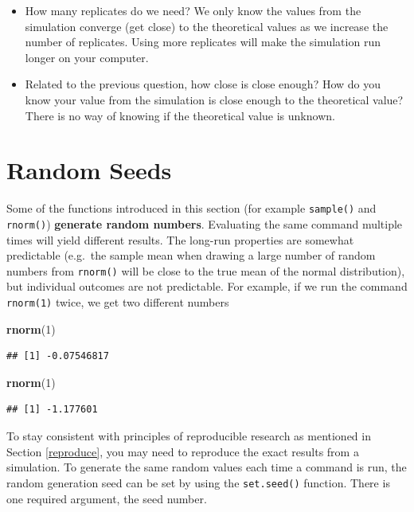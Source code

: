 \documentclass[
]{book}
\newenvironment{Shaded}{\begin{snugshade}}{\end{snugshade}}
\newcommand{\DecValTok}[1]{\textcolor[rgb]{0.00,0.00,0.81}{#1}}
\newcommand{\FunctionTok}[1]{\textcolor[rgb]{0.13,0.29,0.53}{\textbf{#1}}}
\newcommand{\NormalTok}[1]{#1}
\theoremstyle{definition}
\theoremstyle{definition}
\theoremstyle{definition}
\theoremstyle{definition}
\theoremstyle{remark}
\begin{document}
\begin{itemize}
\item
  How many replicates do we need? We only know the values from the simulation converge (get close) to the theoretical values as we increase the number of replicates. Using more replicates will make the simulation run longer on your computer.
\item
  Related to the previous question, how close is close enough? How do you know your value from the simulation is close enough to the theoretical value? There is no way of knowing if the theoretical value is unknown.
\end{itemize}

\hypertarget{random-seeds}{%
\section{Random Seeds}\label{random-seeds}}

Some of the functions introduced in this section (for example \texttt{sample()} and \texttt{rnorm()}) \textbf{generate random numbers}. Evaluating the same command multiple times will yield different results. The long-run properties are somewhat predictable (e.g.~the sample mean when drawing a large number of random numbers from \texttt{rnorm()} will be close to the true mean of the normal distribution), but individual outcomes are not predictable. For example, if we run the command \texttt{rnorm(1)} twice, we get two different numbers

\begin{Shaded}
\begin{Highlighting}[]
\FunctionTok{rnorm}\NormalTok{(}\DecValTok{1}\NormalTok{)}
\end{Highlighting}
\end{Shaded}

\begin{verbatim}
## [1] -0.07546817
\end{verbatim}

\begin{Shaded}
\begin{Highlighting}[]
\FunctionTok{rnorm}\NormalTok{(}\DecValTok{1}\NormalTok{)}
\end{Highlighting}
\end{Shaded}

\begin{verbatim}
## [1] -1.177601
\end{verbatim}

To stay consistent with principles of reproducible research as mentioned in Section \ref{reproduce}, you may need to reproduce the exact results from a simulation. To generate the same random values each time a command is run, the random generation seed can be set by using the \texttt{set.seed()} function. There is one required argument, the seed number.
\end{document}

